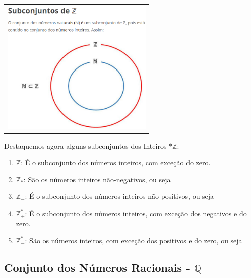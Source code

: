 \begin{multicols*}{2}
    
    \begin{tabular}{@{}c@{}}
        \includegraphics[height=65mm]{assets/Conjunto dos Inteiros Mais os Naturais Nele Contido.png}
    \end{tabular}
			
			Destaquemos agora alguns subconjuntos dos Inteiros $*\mathbb{Z}$:
			
			\begin{enumerate}
			
			\item $\mathbb{Z}$: É o subconjunto dos números inteiros, com exceção do zero. 
			
			\item $\mathbb{Z}_*$: São os números inteiros não-negativos, ou seja 
			
			\item $\mathbb{Z}_-$: É o subconjunto dos números inteiros não-positivos, ou seja 
			
			\item $\mathbb{Z}^*_+ $: É o subconjunto dos números inteiros, com exceção dos negativos e do zero.
			
			\item $\mathbb{Z}^*_- $: São os números inteiros, com exceção dos positivos e do zero, ou seja 
			
			\end{enumerate}						
			
		\subsection{Conjunto dos Números Racionais - $\mathbb{Q}$}
		

\end{multicols*}

